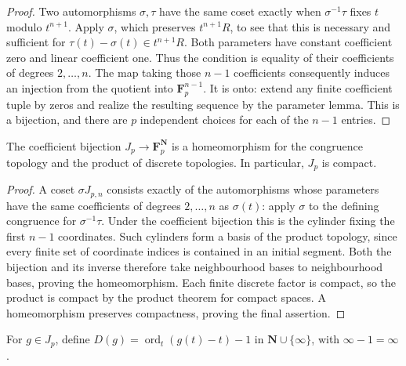 \begin{proof}
Two automorphisms $\sigma,\tau$ have the same coset exactly when
$\sigma^{-1}\tau$ fixes $t$ modulo $t^{n+1}$.
Apply $\sigma$, which preserves $t^{n+1}R$, to see that this is
necessary and sufficient for $\tau(t)-\sigma(t)\in t^{n+1}R$.
Both parameters have constant coefficient zero and linear coefficient
one. Thus the condition is equality of their coefficients of degrees
$2,\ldots,n$. The map taking those $n-1$ coefficients consequently
induces an injection from the quotient into $\mathbf F_p^{n-1}$.
It is onto: extend any finite coefficient tuple by zeros and realize
the resulting sequence by the parameter lemma. This is a bijection,
and there are $p$ independent choices for each of the $n-1$ entries.
\end{proof}

\begin{lemma}
\label{lem:nottingham-compact}
\leanok
The coefficient bijection $J_p\longrightarrow\mathbf F_p^{\mathbf N}$
is a homeomorphism for the congruence topology and the product of
discrete topologies. In particular, $J_p$ is compact.
\end{lemma}

\begin{proof}
A coset $\sigma J_{p,n}$ consists exactly of the automorphisms whose
parameters have the same coefficients of degrees $2,\ldots,n$ as
$\sigma(t)$: apply $\sigma$ to the defining congruence for
$\sigma^{-1}\tau$. Under the coefficient bijection this is the cylinder
fixing the first $n-1$ coordinates. Such cylinders form a basis of the
product topology, since every finite set of coordinate indices is
contained in an initial segment. Both the bijection and its inverse
therefore take neighbourhood bases to neighbourhood bases, proving the
homeomorphism. Each finite discrete factor is compact, so the product
is compact by the product theorem for compact spaces. A homeomorphism
preserves compactness, proving the final assertion.
\end{proof}

\begin{definition}[Depth]
\label{def:nottingham-depth}
\leanok
For $g\in J_p$, define $D(g)=\operatorname{ord}_t(g(t)-t)-1$
in $\mathbf N\cup\{\infty\}$, with $\infty-1=\infty$.
\end{definition}

